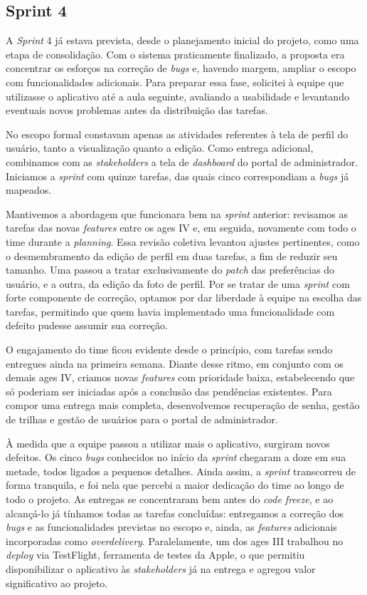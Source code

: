 \subsection{Sprint 4}

A \textit{Sprint} 4 já estava prevista, desde o planejamento inicial do projeto, como uma etapa de consolidação. Com o sistema praticamente finalizado, a proposta era concentrar os esforços na correção de \textit{bugs} e, havendo margem, ampliar o escopo com funcionalidades adicionais. Para preparar essa fase, solicitei à equipe que utilizasse o aplicativo até a aula seguinte, avaliando a usabilidade e levantando eventuais novos problemas antes da distribuição das tarefas.

No escopo formal constavam apenas as atividades referentes à tela de perfil do usuário, tanto a visualização quanto a edição. Como entrega adicional, combinamos com as \textit{stakeholders} a tela de \textit{dashboard} do portal de administrador. Iniciamos a \textit{sprint} com quinze tarefas, das quais cinco correspondiam a \textit{bugs} já mapeados.

Mantivemos a abordagem que funcionara bem na \textit{sprint} anterior: revisamos as tarefas das novas \textit{features} entre os \ac{ages} IV e, em seguida, novamente com todo o time durante a \textit{planning}. Essa revisão coletiva levantou ajustes pertinentes, como o desmembramento da edição de perfil em duas tarefas, a fim de reduzir seu tamanho. Uma passou a tratar exclusivamente do \textit{patch} das preferências do usuário, e a outra, da edição da foto de perfil. Por se tratar de uma \textit{sprint} com forte componente de correção, optamos por dar liberdade à equipe na escolha das tarefas, permitindo que quem havia implementado uma funcionalidade com defeito pudesse assumir sua correção.

O engajamento do time ficou evidente desde o princípio, com tarefas sendo entregues ainda na primeira semana. Diante desse ritmo, em conjunto com os demais \ac{ages} IV, criamos novas \textit{features} com prioridade baixa, estabelecendo que só poderiam ser iniciadas após a conclusão das pendências existentes. Para compor uma entrega mais completa, desenvolvemos recuperação de senha, gestão de trilhas e gestão de usuários para o portal de administrador.

À medida que a equipe passou a utilizar mais o aplicativo, surgiram novos defeitos. Os cinco \textit{bugs} conhecidos no início da \textit{sprint} chegaram a doze em sua metade, todos ligados a pequenos detalhes. Ainda assim, a \textit{sprint} transcorreu de forma tranquila, e foi nela que percebi a maior dedicação do time ao longo de todo o projeto. As entregas se concentraram bem antes do \textit{code freeze}, e ao alcançá-lo já tínhamos todas as tarefas concluídas: entregamos a correção dos \textit{bugs} e as funcionalidades previstas no escopo e, ainda, as \textit{features} adicionais incorporadas como \textit{overdelivery}. Paralelamente, um dos \ac{ages} III trabalhou no \textit{deploy} via TestFlight, ferramenta de testes da Apple, o que permitiu disponibilizar o aplicativo às \textit{stakeholders} já na entrega e agregou valor significativo ao projeto.

